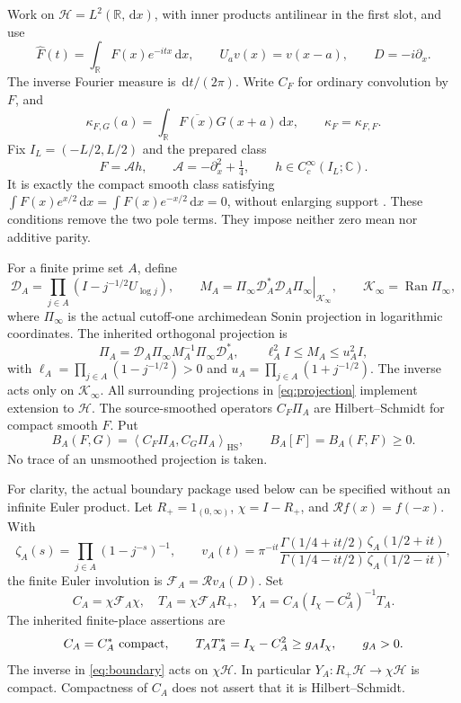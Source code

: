 \documentclass[11pt]{article}
\theoremstyle{remark}
\newcommand{\R}{\mathbb R}
\newcommand{\C}{\mathbb C}
\newcommand{\HH}{\mathcal H}
\newcommand{\KK}{\mathcal K}
\newcommand{\Aprep}{\mathcal A}
\newcommand{\ip}[2]{\left\langle#1,#2\right\rangle}
\newcommand{\dd}{\,\mathrm d}
\DeclareMathOperator{\Ran}{Ran}
\numberwithin{equation}{section}
\begin{document}
Work on \(\HH=L^2(\R,\dd x)\), with inner products antilinear in the first
slot, and use
\[
 \widehat F(t)=\int_\R F(x)e^{-itx}\dd x,\qquad
 U_av(x)=v(x-a),\qquad D=-i\partial_x .
\]
The inverse Fourier measure is \(\dd t/(2\pi)\). Write \(C_F\) for
ordinary convolution by \(F\), and
\begin{equation}\label{eq:kappa}
 \kappa_{F,G}(a)=\int_\R\overline{F(x)}G(x+a)\dd x,\qquad
 \kappa_F=\kappa_{F,F}.
\end{equation}
Fix \(I_L=(-L/2,L/2)\) and the prepared class
\begin{equation}\label{eq:prep}
 F=\Aprep h,\qquad \Aprep=-\partial_x^2+\tfrac14,\qquad
 h\in C_c^\infty(I_L;\C).
\end{equation}
It is exactly the compact smooth class satisfying
\(\int F(x)e^{x/2}\dd x=\int F(x)e^{-x/2}\dd x=0\), without enlarging
support \cite[Section 2]{canonical}. These conditions remove the two pole
terms. They impose neither zero mean nor additive parity.

For a finite prime set \(A\), define
\begin{equation}\label{eq:transport}
 \mathscr D_A=\prod_{j\in A}(I-j^{-1/2}U_{\log j}),\qquad
 M_A=\left.\Pi_\infty\mathscr D_A^*\mathscr D_A
                    \Pi_\infty\right|_{\KK_\infty},
 \qquad \KK_\infty=\Ran\Pi_\infty ,
\end{equation}
where \(\Pi_\infty\) is the actual cutoff-one archimedean Sonin projection
in logarithmic coordinates. The inherited orthogonal projection is
\begin{equation}\label{eq:projection}
 \Pi_A=\mathscr D_A\Pi_\infty M_A^{-1}\Pi_\infty\mathscr D_A^*,
 \qquad
 \ell_A^2I\le M_A\le u_A^2I,
\end{equation}
with \(\ell_A=\prod_{j\in A}(1-j^{-1/2})>0\) and
\(u_A=\prod_{j\in A}(1+j^{-1/2})\). The inverse acts only on
\(\KK_\infty\). All surrounding projections in \eqref{eq:projection}
implement extension to \(\HH\). The source-smoothed operators
\(C_F\Pi_A\) are Hilbert--Schmidt for compact smooth \(F\).
Put
\begin{equation}\label{eq:B}
 B_A(F,G)=\ip{C_F\Pi_A}{C_G\Pi_A}_{\mathrm{HS}},
 \qquad B_A[F]=B_A(F,F)\ge0.
\end{equation}
No trace of an unsmoothed projection is taken.

For clarity, the actual boundary package used below can be specified
without an infinite Euler product. Let \(R_+=1_{(0,\infty)}\),
\(\chi=I-R_+\), and \(\mathscr Rf(x)=f(-x)\). With
\[
 \zeta_A(s)=\prod_{j\in A}(1-j^{-s})^{-1},\qquad
 v_A(t)=\pi^{-it}
 \frac{\Gamma(1/4+it/2)}{\Gamma(1/4-it/2)}
 \frac{\zeta_A(1/2+it)}{\zeta_A(1/2-it)},
\]
the finite Euler involution is \(\mathcal F_A=\mathscr Rv_A(D)\).
Set
\begin{equation}\label{eq:boundary}
 C_A=\chi\mathcal F_A\chi,\quad T_A=\chi\mathcal F_AR_+,\quad
 Y_A=C_A(I_\chi-C_A^2)^{-1}T_A .
\end{equation}
The inherited finite-place assertions are
\[
 C_A=C_A^*\ \hbox{compact},\qquad
 T_AT_A^*=I_\chi-C_A^2\ge g_AI_\chi,\qquad g_A>0 .
\]
The inverse in \eqref{eq:boundary} acts on \(\chi\HH\).
In particular \(Y_A:R_+\HH\to\chi\HH\) is compact. Compactness of \(C_A\)
does not assert that it is Hilbert--Schmidt.
\end{document}
